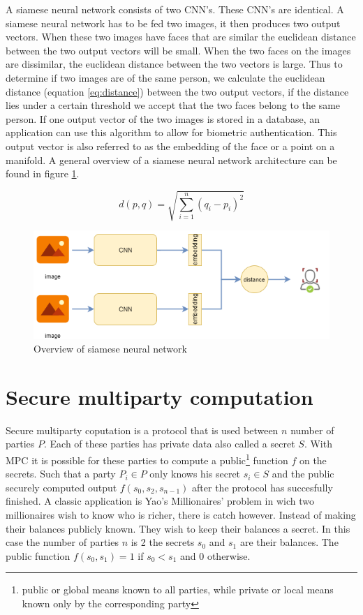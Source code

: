 A siamese neural network consists of two CNN's. These CNN's are identical. A siamese neural network has to be fed two images, it then produces two output vectors. When these two images have faces that are similar the euclidean distance between the two output vectors will be small. When the two faces on the images are dissimilar, the euclidean distance between the two vectors is large. Thus to determine if two images are of the same person, we calculate the euclidean distance (equation \ref{eq:distance}) between the two output vectors, if the distance lies under a certain threshold we accept that the two faces belong to the same person. If one output vector of the two images is stored in a database, an application can use this algorithm to allow for biometric authentication. This output vector is also referred to as the embedding of the face or a point on a manifold. A general overview of a siamese neural network architecture can be found in figure \ref{fig:siamese}.

\begin{equation} \label{eq:distance}
  d(p,q) = \sqrt{\sum_{i=1}^{n}(q_{i}-p_{i})^{2}}
\end{equation}

\begin{figure}[H]
  \includegraphics[width=\linewidth]{fig/siamese.png}
  \caption{Overview of siamese neural network}
  \label{fig:siamese}
\end{figure}

\section{Secure multiparty computation}
Secure multiparty coputation is a protocol that is used between $n$ number of parties $P$. Each of these parties has private data also called a secret $S$. With MPC it is possible for these parties to compute a public\footnote{public or global means known to all parties, while private or local means known only by the corresponding party} function $f$ on the secrets. Such that a party $P_i \in P$ only knows his secret $s_i \in S$ and the public securely computed output $f(s_0,s_2,s_{n-1})$ after the protocol has succesfully finished.
\newline
A classic application is Yao's Millionaires' problem \cite{yao1982protocols} in wich two millionaires wish to know who is richer, there is catch however. Instead of making their balances publicly known. They wish to keep their balances a secret. In this case the number of parties $n$ is 2 the secrets $s_0$ and $s_1$ are their balances. The public function $f(s_0,s_1)=1$ if $s_0<s_1$ and $0$ otherwise.


